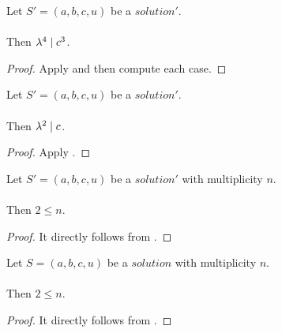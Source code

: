 \begin{lemma}
    \label{lmm:lambda_pow_four_dvd_c_cube}
    \leanok
    Let $S'=(a, b, c, u)$ be a $solution'$. \\\\
    Then $\lambda^4 \mid c^3$.
\end{lemma}
\begin{proof}
    \leanok
    Apply  and then compute each case.
\end{proof}

\begin{lemma}
    \label{lmm:lambda_pow_two_dvd_c}
    \leanok
    Let $S'=(a, b, c, u)$ be a $solution'$. \\\\
    Then $\lambda^2 \mid c$.
\end{lemma}
\begin{proof}
    \leanok
    Apply .
\end{proof}

\begin{lemma}
    \label{lmm:Solution1_two_le_multiplicity}
    \leanok
    Let $S'=(a, b, c, u)$ be a $solution'$ with multiplicity $n$.\\\\
    Then $2 \leq n$.
\end{lemma}
\begin{proof}
    \leanok
    It directly follows from .
\end{proof}

\begin{lemma}
    \label{lmm:Solution_two_le_multiplicity}
    \leanok
    Let $S=(a, b, c, u)$ be a $solution$ with multiplicity $n$.\\\\
    Then $2 \leq n$.
\end{lemma}
\begin{proof}
    \leanok
    It directly follows from .
\end{proof}

